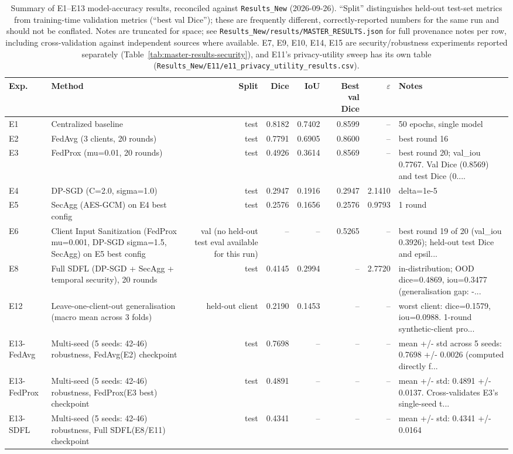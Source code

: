 \begin{table}[t]
\centering
\small
\begin{tabular}{llrrrrrl}
\toprule
Exp. & Method & Split & Dice & IoU & Best val Dice & $\varepsilon$ & Notes \\
\midrule
E1 & Centralized baseline & test & 0.8182 & 0.7402 & 0.8599 & -- & 50 epochs, single model \\
E2 & FedAvg (3 clients, 20 rounds) & test & 0.7791 & 0.6905 & 0.8600 & -- & best round 16 \\
E3 & FedProx (mu=0.01, 20 rounds) & test & 0.4926 & 0.3614 & 0.8569 & -- & best round 20; val\_iou 0.7767. Val Dice (0.8569) and test Dice (0.... \\
E4 & DP-SGD (C=2.0, sigma=1.0) & test & 0.2947 & 0.1916 & 0.2947 & 2.1410 & delta=1e-5 \\
E5 & SecAgg (AES-GCM) on E4 best config & test & 0.2576 & 0.1656 & 0.2576 & 0.9793 & 1 round \\
E6 & Client Input Sanitization (FedProx mu=0.001, DP-SGD sigma=1.5, SecAgg) on E5 best config & val (no held-out test eval available for this run) & -- & -- & 0.5265 & -- & best round 19 of 20 (val\_iou 0.3926); held-out test Dice and epsil... \\
E8 & Full SDFL (DP-SGD + SecAgg + temporal security), 20 rounds & test & 0.4145 & 0.2994 & -- & 2.7720 & in-distribution; OOD dice=0.4869, iou=0.3477 (generalisation gap: -... \\
E12 & Leave-one-client-out generalisation (macro mean across 3 folds) & held-out client & 0.2190 & 0.1453 & -- & -- & worst client: dice=0.1579, iou=0.0988. 1-round synthetic-client pro... \\
E13-FedAvg & Multi-seed (5 seeds: 42-46) robustness, FedAvg(E2) checkpoint & test & 0.7698 & -- & -- & -- & mean +/- std across 5 seeds: 0.7698 +/- 0.0026 (computed directly f... \\
E13-FedProx & Multi-seed (5 seeds: 42-46) robustness, FedProx(E3 best) checkpoint & test & 0.4891 & -- & -- & -- & mean +/- std: 0.4891 +/- 0.0137. Cross-validates E3's single-seed t... \\
E13-SDFL & Multi-seed (5 seeds: 42-46) robustness, Full SDFL(E8/E11) checkpoint & test & 0.4341 & -- & -- & -- & mean +/- std: 0.4341 +/- 0.0164 \\
\bottomrule
\end{tabular}
\caption{Summary of E1--E13 model-accuracy results, reconciled against \texttt{Results\_New} (2026-09-26). ``Split'' distinguishes held-out test-set metrics from training-time validation metrics (``best val Dice''); these are frequently different, correctly-reported numbers for the same run and should not be conflated. Notes are truncated for space; see \texttt{Results\_New/results/MASTER\_RESULTS.json} for full provenance notes per row, including cross-validation against independent sources where available. E7, E9, E10, E14, E15 are security/robustness experiments reported separately (Table~\ref{tab:master-results-security}), and E11's privacy-utility sweep has its own table (\texttt{Results\_New/E11/e11\_privacy\_utility\_results.csv}).}
\label{tab:master-results}
\end{table}
